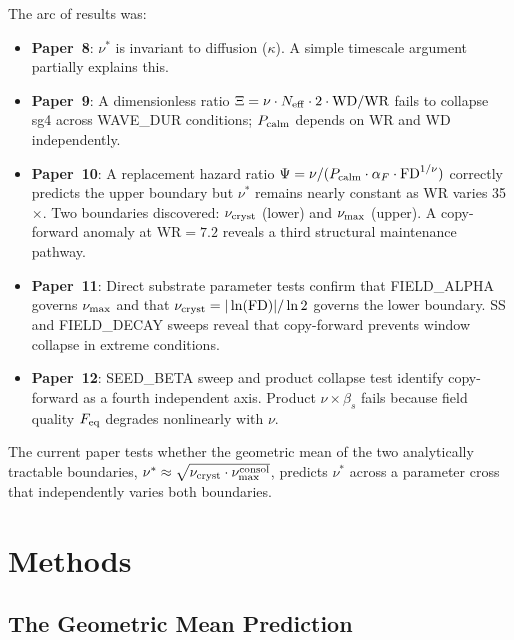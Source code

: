 \documentclass[11pt]{article}
\begin{document}
The arc of results was:
\begin{itemize}
\item \textbf{Paper~8}: $\nu^*$ is invariant to diffusion ($\kappa$). A
  simple timescale argument partially explains this.
\item \textbf{Paper~9}: A dimensionless ratio $\Xi = \nu \cdot N_{\rm
  eff} \cdot 2 \cdot \text{WD} / \text{WR}$ fails to collapse sg4 across
  WAVE\_DUR conditions; $P_{\rm calm}$ depends on WR and WD independently.
\item \textbf{Paper~10}: A replacement hazard ratio $\Psi = \nu /
  (P_{\rm calm} \cdot \alpha_F \cdot \text{FD}^{1/\nu})$ correctly predicts
  the upper boundary but $\nu^*$ remains nearly constant as WR varies 35$\times$.
  Two boundaries discovered: $\nu_{\rm cryst}$ (lower) and $\nu_{\rm max}$
  (upper). A copy-forward anomaly at WR$=7.2$ reveals a third structural
  maintenance pathway.
\item \textbf{Paper~11}: Direct substrate parameter tests confirm that
  FIELD\_ALPHA governs $\nu_{\rm max}$ and that $\nu_{\rm cryst} =
  |\ln(\text{FD})|/\ln 2$ governs the lower boundary. SS and FIELD\_DECAY
  sweeps reveal that copy-forward prevents window collapse in extreme conditions.
\item \textbf{Paper~12}: SEED\_BETA sweep and product collapse test identify
  copy-forward as a fourth independent axis. Product $\nu \times \beta_s$ fails
  because field quality $F_{\rm eq}$ degrades nonlinearly with $\nu$.
\end{itemize}

The current paper tests whether the geometric mean of the two analytically
tractable boundaries, $\nu^* \approx \sqrt{\nu_{\rm cryst} \cdot \nu_{\rm
max}^{\rm consol}}$, predicts $\nu^*$ across a parameter cross that
independently varies both boundaries.

\section{Methods}

\subsection{The Geometric Mean Prediction}
\end{document}
